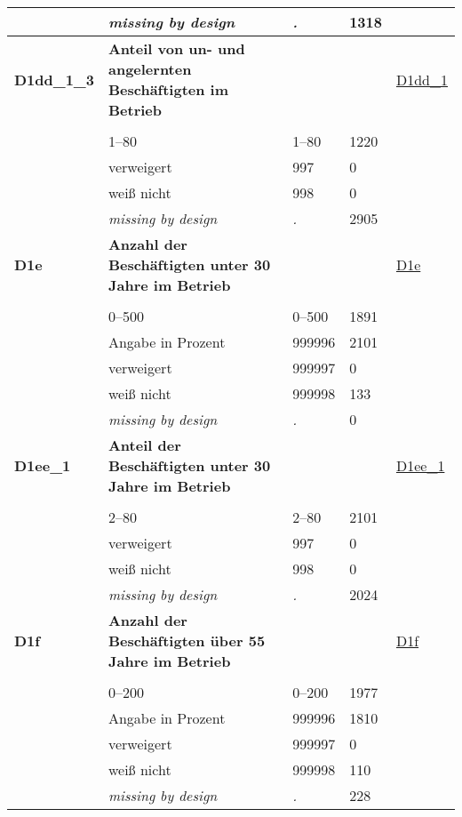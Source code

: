 \begin{longtable}{| L{2.65cm} | L{8cm} | C{1.5cm} | R{1.25cm} | C{2.25cm}  |}
   & \textit{missing by design} & \textit{.} & 1318 &  \\ 
   \midrule
\textbf{D1dd\_1\_3}\label{var:D1dd:1:3} & \textbf{Anteil von un- und angelernten Beschäftigten im Betrieb} &  &  & \hyperref[D1dd:1]{D1dd\_1} \\ 
   &  &  &  &  \\ 
   & 1--80 & 1--80 & 1220 &  \\ 
   & verweigert & 997 & 0 &  \\ 
   & weiß nicht & 998 & 0 &  \\ 
   & \textit{missing by design} & \textit{.} & 2905 &  \\ 
   \midrule
\textbf{D1e}\label{var:D1e} & \textbf{Anzahl der Beschäftigten unter 30 Jahre im Betrieb} &  &  & \hyperref[D1e]{D1e} \\ 
   &  &  &  &  \\ 
   & 0--500 & 0--500 & 1891 &  \\ 
   & Angabe in Prozent & 999996 & 2101 &  \\ 
   & verweigert & 999997 & 0 &  \\ 
   & weiß nicht & 999998 & 133 &  \\ 
   & \textit{missing by design} & \textit{.} & 0 &  \\ 
   \midrule
\textbf{D1ee\_1}\label{var:D1ee:1} & \textbf{Anteil der Beschäftigten unter 30 Jahre im Betrieb} &  &  & \hyperref[D1ee:1]{D1ee\_1} \\ 
   &  &  &  &  \\ 
   & 2--80 & 2--80 & 2101 &  \\ 
   & verweigert & 997 & 0 &  \\ 
   & weiß nicht & 998 & 0 &  \\ 
   & \textit{missing by design} & \textit{.} & 2024 &  \\ 
   \midrule
\textbf{D1f}\label{var:D1f} & \textbf{Anzahl der Beschäftigten über 55 Jahre im Betrieb} &  &  & \hyperref[D1f]{D1f} \\ 
   &  &  &  &  \\ 
   & 0--200 & 0--200 & 1977 &  \\ 
   & Angabe in Prozent & 999996 & 1810 &  \\ 
   & verweigert & 999997 & 0 &  \\ 
   & weiß nicht & 999998 & 110 &  \\ 
   & \textit{missing by design} & \textit{.} & 228 &  \\ 
   \midrule

\end{longtable}
